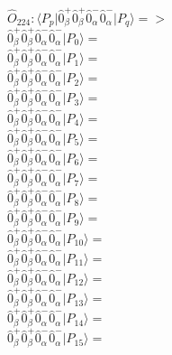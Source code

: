\documentclass[14pt]{article}
\begin{document}
    $\hat{O}_{224}:  \langle{P_p}\vert \hat{0}_{\beta}^{+}\hat{0}_{\beta}^{+}\hat{0}_{\alpha}^{-}\hat{0}_{\alpha}^{-} \vert{P_q}\rangle => $ \\ 
    $ \hat{0}_{\beta}^{+}\hat{0}_{\beta}^{+}\hat{0}_{\alpha}^{-}\hat{0}_{\alpha}^{-} \vert{P_{0}}\rangle =  $ \\ 
    $ \hat{0}_{\beta}^{+}\hat{0}_{\beta}^{+}\hat{0}_{\alpha}^{-}\hat{0}_{\alpha}^{-} \vert{P_{1}}\rangle =  $ \\ 
    $ \hat{0}_{\beta}^{+}\hat{0}_{\beta}^{+}\hat{0}_{\alpha}^{-}\hat{0}_{\alpha}^{-} \vert{P_{2}}\rangle =  $ \\ 
    $ \hat{0}_{\beta}^{+}\hat{0}_{\beta}^{+}\hat{0}_{\alpha}^{-}\hat{0}_{\alpha}^{-} \vert{P_{3}}\rangle =  $ \\ 
    $ \hat{0}_{\beta}^{+}\hat{0}_{\beta}^{+}\hat{0}_{\alpha}^{-}\hat{0}_{\alpha}^{-} \vert{P_{4}}\rangle =  $ \\ 
    $ \hat{0}_{\beta}^{+}\hat{0}_{\beta}^{+}\hat{0}_{\alpha}^{-}\hat{0}_{\alpha}^{-} \vert{P_{5}}\rangle =  $ \\ 
    $ \hat{0}_{\beta}^{+}\hat{0}_{\beta}^{+}\hat{0}_{\alpha}^{-}\hat{0}_{\alpha}^{-} \vert{P_{6}}\rangle =  $ \\ 
    $ \hat{0}_{\beta}^{+}\hat{0}_{\beta}^{+}\hat{0}_{\alpha}^{-}\hat{0}_{\alpha}^{-} \vert{P_{7}}\rangle =  $ \\ 
    $ \hat{0}_{\beta}^{+}\hat{0}_{\beta}^{+}\hat{0}_{\alpha}^{-}\hat{0}_{\alpha}^{-} \vert{P_{8}}\rangle =  $ \\ 
    $ \hat{0}_{\beta}^{+}\hat{0}_{\beta}^{+}\hat{0}_{\alpha}^{-}\hat{0}_{\alpha}^{-} \vert{P_{9}}\rangle =  $ \\ 
    $ \hat{0}_{\beta}^{+}\hat{0}_{\beta}^{+}\hat{0}_{\alpha}^{-}\hat{0}_{\alpha}^{-} \vert{P_{10}}\rangle =  $ \\ 
    $ \hat{0}_{\beta}^{+}\hat{0}_{\beta}^{+}\hat{0}_{\alpha}^{-}\hat{0}_{\alpha}^{-} \vert{P_{11}}\rangle =  $ \\ 
    $ \hat{0}_{\beta}^{+}\hat{0}_{\beta}^{+}\hat{0}_{\alpha}^{-}\hat{0}_{\alpha}^{-} \vert{P_{12}}\rangle =  $ \\ 
    $ \hat{0}_{\beta}^{+}\hat{0}_{\beta}^{+}\hat{0}_{\alpha}^{-}\hat{0}_{\alpha}^{-} \vert{P_{13}}\rangle =  $ \\ 
    $ \hat{0}_{\beta}^{+}\hat{0}_{\beta}^{+}\hat{0}_{\alpha}^{-}\hat{0}_{\alpha}^{-} \vert{P_{14}}\rangle =  $ \\ 
    $ \hat{0}_{\beta}^{+}\hat{0}_{\beta}^{+}\hat{0}_{\alpha}^{-}\hat{0}_{\alpha}^{-} \vert{P_{15}}\rangle =  $ \\ 
    
\end{document}
